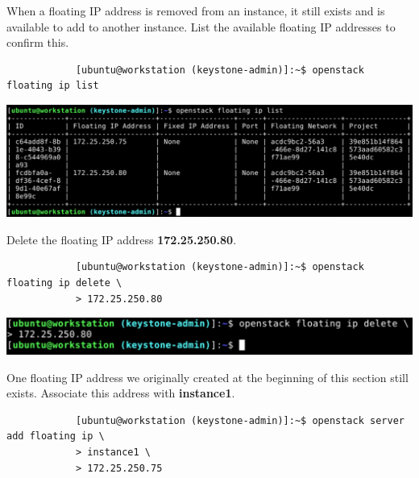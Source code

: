\documentclass[letterpaper, 12pt]{article}
\begin{document}
\begin{enumerate}
    \begin{labstep}
        When a floating IP address is removed from an instance, it still exists and is available to add to another instance.
        List the available floating IP addresses to confirm this.
        \begin{lstlisting}
            [ubuntu@workstation (keystone-admin)]:~$ openstack floating ip list
        \end{lstlisting}

        \begin{center}
            \includegraphics[width=\linewidth]{images/part3/step21.png}
        \end{center}
    \end{labstep}

    \begin{labstep}
        Delete the floating IP address \textbf{172.25.250.80}.
        \begin{lstlisting}
            [ubuntu@workstation (keystone-admin)]:~$ openstack floating ip delete \
            > 172.25.250.80
        \end{lstlisting}

        \begin{center}
            \includegraphics[width=\linewidth]{images/part3/step22.png}
        \end{center}
    \end{labstep}

    \begin{labstep}
        One floating IP address we originally created at the beginning of this section still exists.
        Associate this address with \textbf{instance1}.
        \begin{lstlisting}
            [ubuntu@workstation (keystone-admin)]:~$ openstack server add floating ip \
            > instance1 \
            > 172.25.250.75
        \end{lstlisting}


\end{labstep}
\end{enumerate}
\end{document}
